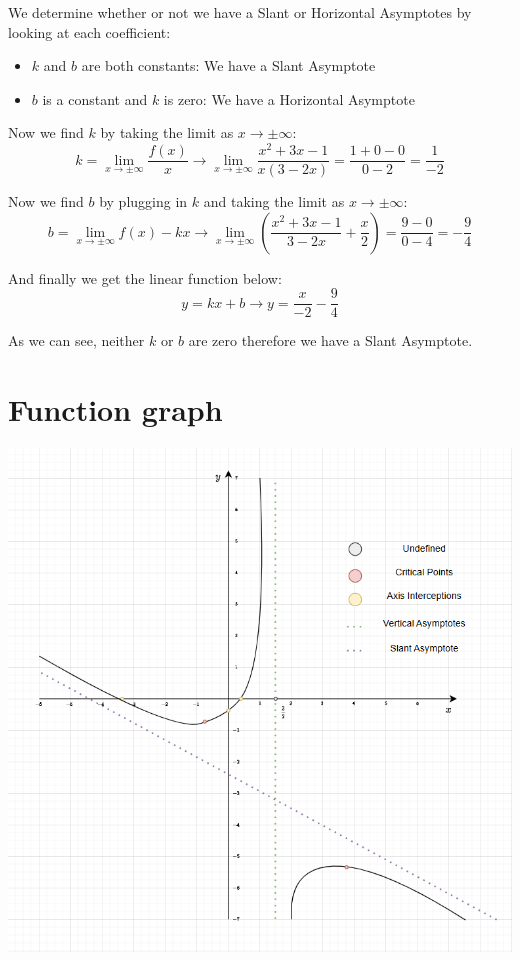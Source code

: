 \documentclass[11pt]{article}
\begin{document}
We determine whether or not we have a Slant or Horizontal Asymptotes by looking at each coefficient:
\begin{itemize}
\item \(k\) and \(b\) are both constants: We have a Slant Asymptote
\item \(b\) is a constant and \(k\) is zero: We have a Horizontal Asymptote
\end{itemize}

Now we find \(k\) by taking the limit as \(x \rightarrow \pm \infty\):
\[
k=\lim_{x\to\pm\infty} \frac{f(x)}{x} \rightarrow \lim_{x\to\pm\infty} \frac{x^2+3x-1}{x(3-2x)} = \frac{1+0-0}{0-2} = \frac{1}{-2}
\]

Now we find \(b\) by plugging in \(k\) and taking the limit as \(x \rightarrow \pm \infty\):
\[
b=\lim_{x\to\pm\infty} f(x)-kx \rightarrow \lim_{x\to\pm\infty} \left( \frac{x^2+3x-1}{3-2x} + \frac{x}{2} \right) = \frac{9-0}{0-4} = -\frac{9}{4}
\]

And finally we get the linear function below:
\[
y=kx+b \rightarrow y=\frac{x}{-2}-\frac{9}{4}
\]

As we can see, neither \(k\) or \(b\) are zero therefore we have a Slant Asymptote.
\section{Function graph}
\label{sec:org5b0ca8e}
\begin{center}
\includegraphics[width=.9\linewidth]{./holy_balony.png}
\end{center}
\end{document}
